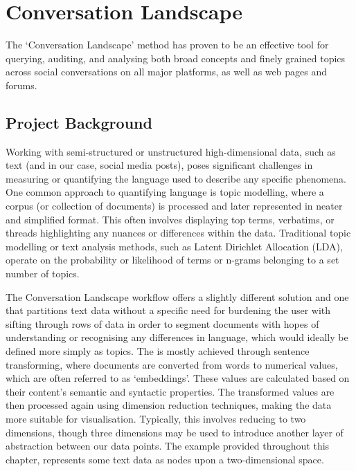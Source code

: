\documentclass[
  letterpaper,
  DIV=11,
  numbers=noendperiod]{scrreprt}
\begin{document}
\chapter{Conversation Landscape}\label{conversation-landscape}

The `Conversation Landscape' method has proven to be an effective tool
for querying, auditing, and analysing both broad concepts and finely
grained topics across social conversations on all major platforms, as
well as web pages and forums.

\section{Project Background}\label{project-background}

Working with semi-structured or unstructured high-dimensional data, such
as text (and in our case, social media posts), poses significant
challenges in measuring or quantifying the language used to describe any
specific phenomena. One common approach to quantifying language is topic
modelling, where a corpus (or collection of documents) is processed and
later represented in neater and simplified format. This often involves
displaying top terms, verbatims, or threads highlighting any nuances or
differences within the data. Traditional topic modelling or text
analysis methods, such as Latent Dirichlet Allocation (LDA), operate on
the probability or likelihood of terms or n-grams belonging to a set
number of topics.

The Conversation Landscape workflow offers a slightly different solution
and one that partitions text data without a specific need for burdening
the user with sifting through rows of data in order to segment documents
with hopes of understanding or recognising any differences in language,
which would ideally be defined more simply as topics. The is mostly
achieved through sentence transforming, where documents are converted
from words to numerical values, which are often referred to as
`embeddings'. These values are calculated based on their content's
semantic and syntactic properties. The transformed values are then
processed again using dimension reduction techniques, making the data
more suitable for visualisation. Typically, this involves reducing to
two dimensions, though three dimensions may be used to introduce another
layer of abstraction between our data points. The example provided
throughout this chapter, represents some text data as nodes upon a
two-dimensional space.
\end{document}
